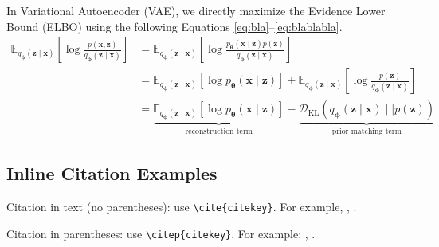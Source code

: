 In Variational Autoencoder (VAE), we directly maximize the Evidence Lower Bound (ELBO) using the following Equations \ref{eq:bla}--\ref{eq:blablabla}.
\begin{align}
  \mathbb{E}_{q_{\boldsymbol{\phi}}(\boldsymbol{z}\mid\boldsymbol{x})}\left[\log\frac{p(\boldsymbol{x}, \boldsymbol{z})}{q_{\boldsymbol{\phi}}(\boldsymbol{z}\mid\boldsymbol{x})}\right]
  &= \mathbb{E}_{q_{\boldsymbol{\phi}}(\boldsymbol{z}\mid\boldsymbol{x})}\left[\log\frac{p_{\boldsymbol{\theta}}(\boldsymbol{x}\mid\boldsymbol{z})p(\boldsymbol{z})}{q_{\boldsymbol{\phi}}(\boldsymbol{z}\mid\boldsymbol{x})}\right] \label{eq:bla} \\
  &= \mathbb{E}_{q_{\boldsymbol{\phi}}(\boldsymbol{z}\mid\boldsymbol{x})}\left[\log p_{\boldsymbol{\theta}}(\boldsymbol{x}\mid\boldsymbol{z})\right] + \mathbb{E}_{q_{\boldsymbol{\phi}}(\boldsymbol{z}\mid\boldsymbol{x})}\left[\log\frac{p(\boldsymbol{z})}{q_{\boldsymbol{\phi}}(\boldsymbol{z}\mid\boldsymbol{x})}\right] \label{eq:blabla} \\
  &= \underbrace{\mathbb{E}_{q_{\boldsymbol{\phi}}(\boldsymbol{z}\mid\boldsymbol{x})}\left[\log p_{\boldsymbol{\theta}}(\boldsymbol{x}\mid\boldsymbol{z})\right]}_\text{reconstruction term} - \underbrace{\mathcal{D}_{\text{KL}}(q_{\boldsymbol{\phi}}(\boldsymbol{z}\mid\boldsymbol{x}) \mid\mid p(\boldsymbol{z}))}_\text{prior matching term} \label{eq:blablabla}
\end{align}

\subsection{Inline Citation Examples}

Citation in text (no parentheses): use \texttt{{\textbackslash}cite\{citekey\}}. 
For example, \cite{breiman2011}, \cite{devlin2019bert}.

Citation in parentheses: use \texttt{{\textbackslash}citep\{citekey\}}. 
For example: \citep{vaswani2023attention}, \citep{karras2019stylebased}.
